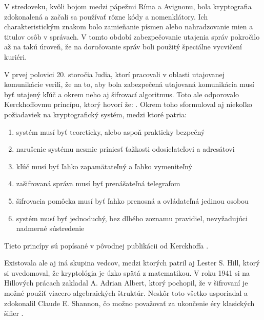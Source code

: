 V stredoveku, kvôli bojom medzi pápežmi Ríma a Avignonu, bola kryptografia zdokonalená a začali sa používať rôzne kódy a nomenklátory.
Ich charakteristickým znakom bolo zamieňanie písmen alebo nahradzovanie mien a titulov osôb v správach.
V tomto období zabezpečovanie utajenia správ pokročilo až na takú úroveň, že na doručovanie správ boli použitý špeciálne vycvičení kuriéri.

V prvej polovici 20. storočia ľudia, ktorí pracovali v oblasti utajovanej komunikácie verili, že na to, aby bola zabezpečená utajovaná komunikácia musí byť utajený kľúč a okrem neho aj šifrovací algoritmus. Toto ale odporovalo Kerckhoffovmu princípu, ktorý hovorí že: . Okrem toho sformuloval aj niekoľko požiadaviek na kryptografický systém, medzi ktoré patria:
\begin{enumerate}
\item systém musí byť teoreticky, alebo aspoň prakticky bezpečný
\item narušenie systému nesmie priniesť ťažkosti odosielateľovi a adresátovi
\item kľúč musí byť ľahko zapamätateľný a ľahko vymeniteľný
\item zašifrovaná správa musí byť prenášateľná telegrafom
\item šifrovacia pomôcka musí byť ľahko prenosná a ovládateľná jedinou osobou
\item systém musí byť jednoduchý, bez dlhého zoznamu pravidiel, nevyžadujúci nadmerné sústredenie
\end{enumerate}
Tieto princípy sú popísané v pôvodnej publikácii od Kerckhoffa \cite{kerckhoff}.

Existovala ale aj iná skupina vedcov, medzi ktorých patril aj Lester S. Hill, ktorý si uvedomoval, že kryptológia je úzko spätá z matematikou.
V roku 1941 si na Hillových prácach zakladal A. Adrian Albert, ktorý pochopil, že v šifrovaní je možné použiť viacero algebraických štruktúr.
Neskôr toto všetko usporiadal a zdokonalil Claude E. Shannon, čo možno považovať za ukončenie éry klasických šifier \cite{ks}.


